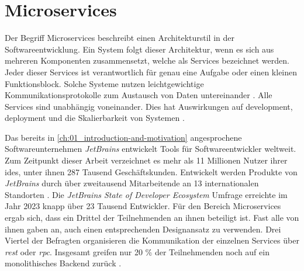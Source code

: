 \section{Microservices}
\label{sec:02-02_microservices}

Der Begriff Microservices beschreibt einen Architekturstil in der Softwareentwicklung. Ein System folgt dieser Architektur, wenn es sich aus mehreren Komponenten zusammensetzt, welche als Services bezeichnet werden. Jeder dieser Services ist verantwortlich für genau eine Aufgabe oder einen kleinen Funktionsblock. Solche Systeme nutzen leichtgewichtige Kommunikationsprotokolle zum Austausch von Daten untereinander \cite{027:Containerized-Microservices-Deployment-Approach}. Alle Services sind unabhängig voneinander. Dies hat Auswirkungen auf \Gls{development}, \Gls{deployment} und die Skalierbarkeit von Systemen \cite{028:Analyzing-Microservices-and-Monolithic-Systems}.

Das bereits in \autoref{ch:01_introduction-and-motivation} angesprochene Softwareunternehmen \textit{JetBrains} entwickelt Tools für Softwareentwickler weltweit. Zum Zeitpunkt dieser Arbeit verzeichnet es mehr als 11 Millionen Nutzer ihrer \Glspl{ide}, unter ihnen 287 Tausend Geschäftskunden. Entwickelt werden Produkte von \textit{JetBrains} durch über zweitausend Mitarbeitende an 13 internationalen Standorten \cite{210:Jet-Brains-Company}. Die \textit{JetBrains State of Developer Ecosystem} Umfrage erreichte im Jahr 2023 knapp über 23 Tausend Entwickler. Für den Bereich Microservices ergab sich, dass ein Drittel der Teilnehmenden an ihnen beteiligt ist. Fast alle von ihnen gaben an, auch einen entsprechenden Designansatz zu verwenden. Drei Viertel der Befragten organisieren die Kommunikation der einzelnen Services über \textit{\Gls{rest}} oder \textit{\Gls{rpc}}. Insgesamt greifen nur 20 \% der Teilnehmenden noch auf ein monolithisches Backend zurück \cite{207:Developer-Ecosystem}.

